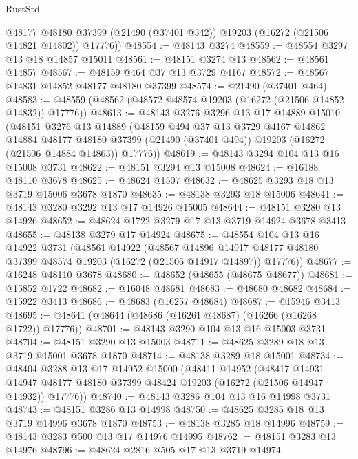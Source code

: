 \begin{lexlean}{RustStd}
\begin{coremodule}
        @48177
        @48180
        @37399
        (@21490 (@37401 @342))
        @19203
        (@16272 (@21506 @14821 @14802))
        @17776))
@48554 := @48143 @3274
@48559 := @48554 @3297 @13 @18 @14857 @15011
@48561 := @48151 @3274 @13
@48562 := @48561 @14857
@48567 := @48159 @464 @37 @13 @3729 @4167
@48572 := @48567 @14831 @14852 @48177 @48180 @37399
@48574 := @21490 (@37401 @464)
@48583 := @48559 (@48562 (@48572 @48574 @19203 (@16272 (@21506 @14852 @14832)) @17776))
@48613 := @48143
    @3276
    @3296
    @13
    @17
    @14889
    @15010
    (@48151
      @3276
      @13
      @14889
      (@48159
        @494
        @37
        @13
        @3729
        @4167
        @14862
        @14884
        @48177
        @48180
        @37399
        (@21490 (@37401 @494))
        @19203
        (@16272 (@21506 @14884 @14863))
        @17776))
@48619 := @48143 @3294 @104 @13 @16 @15008 @3731
@48622 := @48151 @3294 @13 @15008
@48624 := @16188 @48110 @3678
@48625 := @48624 @1507
@48632 := @48625 @3293 @18 @13 @3719 @15006 @3678 @1870
@48635 := @48138 @3293 @18 @15006
@48641 := @48143 @3280 @3292 @13 @17 @14926 @15005
@48644 := @48151 @3280 @13 @14926
@48652 := @48624 @1722 @3279 @17 @13 @3719 @14924 @3678 @3413
@48655 := @48138 @3279 @17 @14924
@48675 := @48554
    @104
    @13
    @16
    @14922
    @3731
    (@48561
      @14922
      (@48567
        @14896
        @14917
        @48177
        @48180
        @37399
        @48574
        @19203
        (@16272 (@21506 @14917 @14897))
        @17776))
@48677 := @16248 @48110 @3678
@48680 := @48652 (@48655 (@48675 @48677))
@48681 := @15852 @1722
@48682 := @16048 @48681
@48683 := @48680 @48682
@48684 := @15922 @3413
@48686 := @48683 (@16257 @48684)
@48687 := @15946 @3413
@48695 := @48641 (@48644 (@48686 (@16261 @48687) (@16266 (@16268 @1722)) @17776))
@48701 := @48143 @3290 @104 @13 @16 @15003 @3731
@48704 := @48151 @3290 @13 @15003
@48711 := @48625 @3289 @18 @13 @3719 @15001 @3678 @1870
@48714 := @48138 @3289 @18 @15001
@48734 := @48404
    @3288
    @13
    @17
    @14952
    @15000
    (@48411
      @14952
      (@48417
        @14931
        @14947
        @48177
        @48180
        @37399
        @48424
        @19203
        (@16272 (@21506 @14947 @14932))
        @17776))
@48740 := @48143 @3286 @104 @13 @16 @14998 @3731
@48743 := @48151 @3286 @13 @14998
@48750 := @48625 @3285 @18 @13 @3719 @14996 @3678 @1870
@48753 := @48138 @3285 @18 @14996
@48759 := @48143 @3283 @500 @13 @17 @14976 @14995
@48762 := @48151 @3283 @13 @14976
@48796 := @48624
    @2816
    @505
    @17
    @13
    @3719
    @14974

\end{coremodule}
\end{lexlean}
